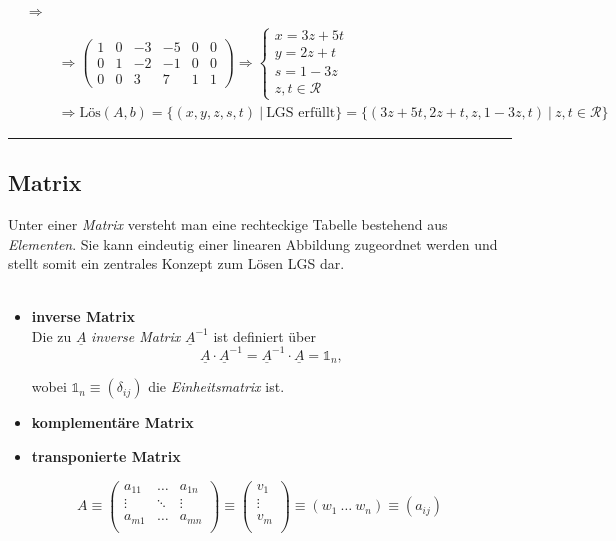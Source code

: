 \documentclass{article}
\begin{document}
{\begin{align*}
{\begin{array}{l}
		\end{array}}
		\Rightarrow\\
		&\Rightarrow
		\left(\begin{array}{ccccc|c}
			1 & 0 & -3 & -5 & 0 & 0 \\
			0 & 1 & -2 & -1 & 0 & 0 \\
			0 & 0 & 3 & 7 & 1 & 1
		\end{array}\right)
		\Rightarrow
		\begin{cases}
			x = 3z + 5t\\
			y = 2z + t\\
			s = 1 - 3z\\
			z,t\in\mathcal{R}
		\end{cases}\\
		&\Rightarrow \text{Lös}(A,b) = \{(x,y,z,s,t)\ |\ \text{LGS erfüllt}\} = \{(3z+5t,2z+t,z,1-3z,t)\ |\ z,t\in\mathcal{R}\}
	\end{align*}
\hrule
}


\newpage


\subsection{Matrix}
Unter einer \textit{Matrix} versteht man eine rechteckige Tabelle bestehend aus \textit{Elementen}. Sie kann eindeutig einer linearen Abbildung zugeordnet werden und stellt somit ein zentrales Konzept zum Lösen LGS dar.\\
\\
	\begin{itemize}
		\item \textbf{inverse Matrix}\\
		Die zu $\underline{A}$ \textit{inverse Matrix} $\underline{A}^{-1}$ ist definiert über
			\begin{equation}
				\underline{A} \cdot \underline{A}^{-1} = \underline{A}^{-1} \cdot \underline{A} = \mathbb{1}_n,
			\end{equation}
		
		wobei $\mathbb{1}_n \equiv (\delta_{ij})$ die \textit{Einheitsmatrix} ist.


		\item \textbf{komplementäre Matrix}
		
		
		\item \textbf{transponierte Matrix}
	\end{itemize}


	\begin{equation}
		A \equiv
		\begin{pmatrix}
			a_{11} & \dots & a_{1n} \\
			\vdots & \ddots & \vdots \\
			a_{m1} & \dots & a_{mn} \\
		\end{pmatrix}
		\equiv
		\begin{pmatrix}
			v_1 \\
			\vdots \\
			v_m \\
		\end{pmatrix}
		\equiv
		(w_1\ \dots\ w_n)
		\equiv
		 (a_{ij})
	\end{equation}
\end{document}
